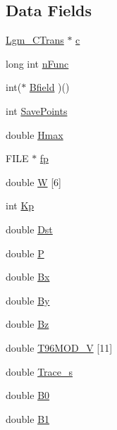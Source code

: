 \subsection*{Data Fields}
\begin{CompactItemize}
\item 
\hyperlink{struct_lgm___c_trans}{Lgm\_\-CTrans} $\ast$ \hyperlink{struct_lgm___mag_model_info_db73b2e3eecb2b5b5d8a8d278fd592e7}{c}
\item 
long int \hyperlink{struct_lgm___mag_model_info_86d7303c776d4ec954324d5c477c79a2}{nFunc}
\item 
int($\ast$ \hyperlink{struct_lgm___mag_model_info_b0506253f98bbfee0c9a097ca2bc52fe}{Bfield} )()
\item 
int \hyperlink{struct_lgm___mag_model_info_947337af07b4114cc9f9706bfcb809de}{SavePoints}
\item 
double \hyperlink{struct_lgm___mag_model_info_d8e5a89709cc62b7538c1429c0bea670}{Hmax}
\item 
FILE $\ast$ \hyperlink{struct_lgm___mag_model_info_a065f30aa9f5f9a42132c82c787ee70b}{fp}
\item 
double \hyperlink{struct_lgm___mag_model_info_c186dbd58445ff8691db0f437f862a54}{W} \mbox{[}6\mbox{]}
\item 
int \hyperlink{struct_lgm___mag_model_info_c660713cdd5b69708fe7c4866be48b53}{Kp}
\item 
double \hyperlink{struct_lgm___mag_model_info_521a6affefa837861b71a21b021b109b}{Dst}
\item 
double \hyperlink{struct_lgm___mag_model_info_8019aa9167c19c810aefa4cd5c0b0ab5}{P}
\item 
double \hyperlink{struct_lgm___mag_model_info_5fa1384b59affe6ed504db99bba961fe}{Bx}
\item 
double \hyperlink{struct_lgm___mag_model_info_01b195b7d857f35425ee41d84eea6a1a}{By}
\item 
double \hyperlink{struct_lgm___mag_model_info_cf4e512cfc2056dc67f7f73aeb07ea3b}{Bz}
\item 
double \hyperlink{struct_lgm___mag_model_info_bc39a5f9f3bf06b9ae46dd8588d3bd79}{T96MOD\_\-V} \mbox{[}11\mbox{]}
\item 
double \hyperlink{struct_lgm___mag_model_info_d543ac40b07dbe5a76060b7f56b90094}{Trace\_\-s}
\item 
double \hyperlink{struct_lgm___mag_model_info_f8c1a0342c71ca07cc809e7e808ec81e}{B0}
\item 
double \hyperlink{struct_lgm___mag_model_info_612bfe392d6bf2d2e1a2f6e65a003f5e}{B1}

\end{CompactItemize}
